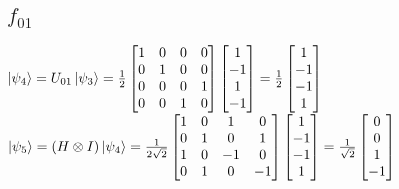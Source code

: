 \documentclass{iansnotes}
\begin{document}
\subsection{$f_{01}$}
$\ket{\psi_4} = U_{01} \ket{\psi_3} = \frac{1}{2}\begin{bmatrix} 1 & 0 & 0 & 0 \\ 0 & 1 & 0 & 0 \\ 0 & 0 & 0 & 1 \\ 0 & 0 & 1 & 0 \end{bmatrix}\begin{bmatrix} 1 \\ -1 \\ 1 \\ -1 \end{bmatrix} = \frac{1}{2}\begin{bmatrix} 1 \\ -1 \\ -1 \\ 1 \end{bmatrix}$\\[12mm]
\noindent$\ket{\psi_5} = (H \otimes I) \ket{\psi_4} = \frac{1}{2\sqrt{2}} \begin{bmatrix} 1 & 0 & 1 & 0 \\ 0 & 1 & 0 & 1 \\ 1 & 0 & -1 & 0 \\ 0 & 1 & 0 & -1 \end{bmatrix} \begin{bmatrix} 1 \\ -1 \\ -1 \\ 1 \end{bmatrix} = \frac{1}{\sqrt{2}} \begin{bmatrix} 0 \\ 0 \\ 1 \\ -1 \end{bmatrix}$\\[20mm]
\end{document}
